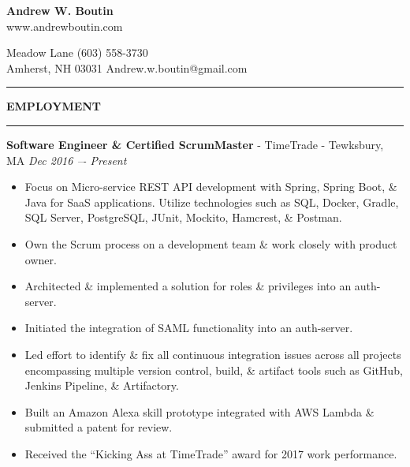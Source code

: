 \documentclass[a4paper,10pt]{article}
\begin{document}
\thispagestyle{empty}

{\centering
  \textbf{{\fontsize{13}{15.6} \selectfont Andrew W. Boutin}}\\
  www.andrewboutin.com\par
}
 Meadow Lane
\hfill
(603) 558-3730\\
Amherst, NH 03031
\hfill
Andrew.w.boutin@gmail.com
\vspace{3pt}
\hrule
\vspace{\baselineskip}

\noindent
\textbf{EMPLOYMENT}
\vspace{5pt}
\hrule
\vspace{3pt}
\noindent\textbf{Software Engineer \& Certified ScrumMaster} - TimeTrade - Tewksbury, MA
\hfill
\textit{Dec 2016 –- Present}
\begin{itemize}
\setlength\itemsep{0.0em}
\item Focus on Micro-service REST API development with Spring, Spring Boot, \& Java for SaaS applications. Utilize technologies such as SQL, Docker, Gradle, SQL Server, PostgreSQL, JUnit, Mockito, Hamcrest, \& Postman.
\item Own the Scrum process on a development team \& work closely with product owner.
\item Architected \& implemented a solution for roles \& privileges into an auth-server.
\item Initiated the integration of SAML functionality into an auth-server.
\item Led effort to identify \& fix all continuous integration issues across all projects encompassing multiple version control, build, \& artifact tools such as GitHub, Jenkins Pipeline, \& Artifactory.
\item Built an Amazon Alexa skill prototype integrated with AWS Lambda \& submitted a patent for review.
\item Received the “Kicking Ass at TimeTrade” award for 2017 work performance.
\end{itemize}
\vspace{\baselineskip}
\end{document}
